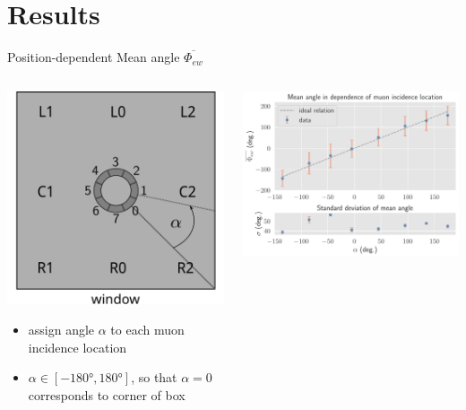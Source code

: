 \documentclass[aspectratio=169]{beamer}
\begin{document}
	\section{Results}

	
	\begin{frame}{Position-dependent Mean angle $\overline{\Phi_{ew}}$}
		\begin{columns}
			
			\begin{column}{0.4\textwidth}
				\centering
				\includegraphics[width=.7\textwidth]{pictures/relative-locations.pdf}
				\begin{itemize}
					\item assign angle $\alpha$ to each muon incidence location
					\item $\alpha \in \left[-\ang{180},\ang{180}\right]$, so that $\alpha = 0$ corresponds to corner of box
				\end{itemize}
			\end{column}
		
			\begin{column}{0.6\textwidth}
				\includegraphics[width=\textwidth]{./new_alex/phi_ew_alpha.pdf}
			\end{column}
		
		\end{columns}
	
	
	\end{frame}
\end{document}
